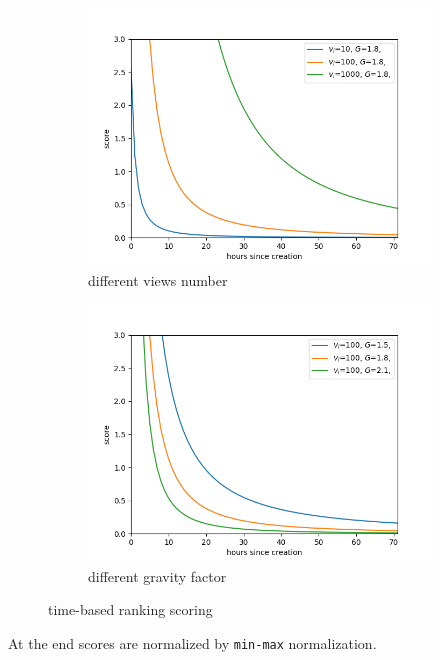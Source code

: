 \documentclass{article}
\begin{document}
\begin{figure}[h]
  \begin{subfigure}[b]{0.5\textwidth}
    \includegraphics[width=\textwidth]{images/time_ranking_1.png}
    \caption{different views number}
  \end{subfigure}
  \hfill
  \begin{subfigure}[b]{0.5\textwidth}
    \includegraphics[width=\textwidth]{images/time_ranking_2.png}
    \caption{different gravity factor}
  \end{subfigure}
\caption{time-based ranking scoring}
    \label{fig:samples}
\end{figure}


At the end scores are normalized by \texttt{min-max} normalization.
\end{document}
